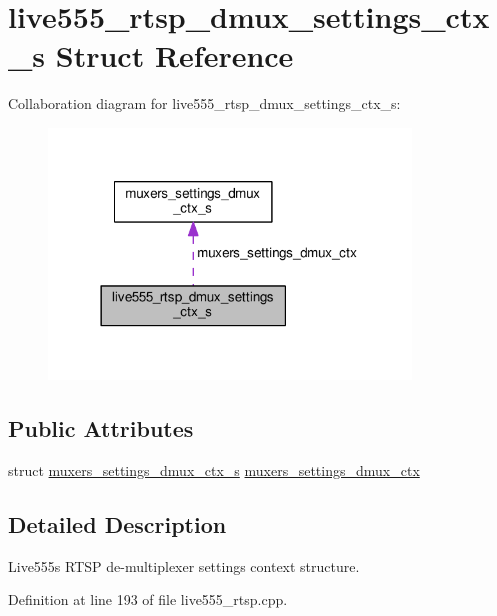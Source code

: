 \hypertarget{structlive555__rtsp__dmux__settings__ctx__s}{}\section{live555\+\_\+rtsp\+\_\+dmux\+\_\+settings\+\_\+ctx\+\_\+s Struct Reference}
\label{structlive555__rtsp__dmux__settings__ctx__s}


Collaboration diagram for live555\+\_\+rtsp\+\_\+dmux\+\_\+settings\+\_\+ctx\+\_\+s\+:\nopagebreak
\begin{figure}[H]
\begin{center}
\leavevmode
\includegraphics[width=273pt]{structlive555__rtsp__dmux__settings__ctx__s__coll__graph}
\end{center}
\end{figure}
\subsection*{Public Attributes}
\begin{DoxyCompactItemize}
\item 
struct \hyperlink{structmuxers__settings__dmux__ctx__s}{muxers\+\_\+settings\+\_\+dmux\+\_\+ctx\+\_\+s} \hyperlink{structlive555__rtsp__dmux__settings__ctx__s_af1c689c7f424a63ac4f5fa09d1832c15}{muxers\+\_\+settings\+\_\+dmux\+\_\+ctx}
\end{DoxyCompactItemize}


\subsection{Detailed Description}
Live555\textquotesingle{}s R\+T\+SP de-\/multiplexer settings context structure. 

Definition at line 193 of file live555\+\_\+rtsp.\+cpp.



